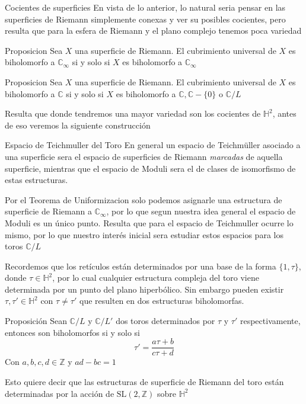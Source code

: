 \documentclass[xcolor=dvipsnames,10pt]{beamer}
\newcommand\Z{\ensuremath{\mathbb{Z}}}
\newcommand\C{\ensuremath{\mathbb{C}}}
\newcommand\Hs{\ensuremath{\mathbb{H}}}
\begin{document}
\begin{frame}{Cocientes de superficies}
    En vista de lo anterior, lo natural seria pensar en las superficies de Riemann simplemente conexas y ver su posibles cocientes, pero resulta que para la esfera de Riemann y el plano complejo tenemos poca variedad
    \begin{block}{Proposicion}
        Sea $X$ una superficie de Riemann. El cubrimiento universal de $X$ es biholomorfo a $\C_\infty$ si y solo si $X$ es biholomorfo a $\C_\infty$
    \end{block}
    \begin{block}{Proposicion}
        Sea $X$ una superficie de Riemann. El cubrimiento universal de $X$ es biholomorfo a $\C$ si y solo si $X$ es biholomorfo a $\C,\C-\{0\}$ o $\C/L$
    \end{block}
    Resulta que donde tendremos una mayor variedad son los cocientes de $\Hs^2$, antes de eso veremos la siguiente construcción
\end{frame}
\begin{frame}{Espacio de Teichmuller del Toro}
    En general un espacio de Teichmüller asociado a una superficie sera el espacio de superficies de Riemann \textit{marcadas} de aquella superficie, mientras que el espacio de Moduli sera el de clases de isomorfismo de estas estructuras.\\
    \vspace{0.5cm}

    Por el Teorema de Uniformizacion solo podemos asignarle una estructura de superficie de Riemann a $\C_\infty$, por lo que segun nuestra idea general el espacio de Moduli es un único punto. Resulta que para el espacio de Teichmuller ocurre lo mismo, por lo que nuestro interés inicial sera estudiar estos espacios para los toros $\C/L$
\end{frame}
\begin{frame}
    Recordemos que los retículos están determinados por una base de la forma $\{1,\tau\}$, donde $\tau\in \Hs^2$, por lo cual cualquier estructura compleja del toro viene determinada por un punto del plano hiperbólico. Sin embargo pueden existir $\tau, \tau' \in \Hs^2$ con $\tau \neq \tau'$ que resulten en dos estructuras biholomorfas.

    \begin{block}{Proposición}
        Sean $\C/L$ y $\C/L'$ dos toros determinados por $\tau$ y $\tau'$ respectivamente, entonces son biholomorfos si y solo si
        \[
            \tau' = \frac{a\tau + b}{c\tau + d}
        \]
        Con $a,b,c,d \in \Z$ y $ad-bc=1$
    \end{block}

    Esto quiere decir que las estructuras de superficie de Riemann del toro están determinadas por la acción de $\text{SL}(2,\Z)$ sobre $\Hs^2$
\end{frame}
\end{document}
